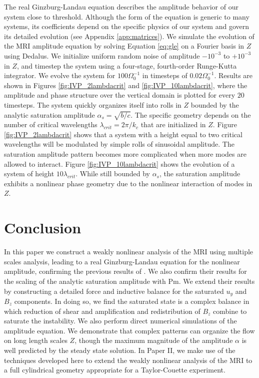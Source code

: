 \documentclass{emulateapj}
\newcommand{\Pm}{\mathrm{Pm}}
\begin{document}
The real Ginzburg-Landau equation describes the amplitude behavior of our system close to threshold. Although the form of the equation is generic to many systems, its coefficients depend on the specific physics of our system and govern its detailed evolution (see Appendix \ref{app:matrices}). We simulate the evolution of the MRI amplitude equation by solving Equation \ref{eq:gle} on a Fourier basis in $Z$ using Dedalus. We initialize uniform random noise of amplitude $-10^{-3}$ to $+10^{-3}$ in $Z$, and timestep the system using a four-stage, fourth-order Runge-Kutta integrator. We evolve the system for $100 \Omega_0^{-1}$ in timesteps of $0.02 \Omega_0^{-1}$. Results are shown in Figures \ref{fig:IVP_2lambdacrit} and \ref{fig:IVP_10lambdacrit}, where the amplitude and phase structure over the vertical domain is plotted for every $20$ timesteps. The system quickly organizes itself into rolls in $Z$ bounded by the analytic saturation amplitude $\alpha_s = \sqrt{b/c}$. The specific geometry depends on the number of critical wavelengths $\lambda_{crit} = 2\pi/k_c$ that are initialized in $Z$. Figure \ref{fig:IVP_2lambdacrit} shows that a system with a height equal to two critical wavelengths will be modulated by simple rolls of sinusoidal amplitude. The saturation amplitude pattern becomes more complicated when more modes are allowed to interact. Figure \ref{fig:IVP_10lambdacrit} shows the evolution of a system of height $10 \lambda_{crit}$. While still bounded by $\alpha_s$, the saturation amplitude exhibits a nonlinear phase geometry due to the nonlinear interaction of modes in $Z$. 

\section{Conclusion}
\label{sec:conclusion}

In this paper we construct a weakly nonlinear analysis of the MRI using multiple scales analysis, leading to a real Ginzburg-Landau equation for the nonlinear amplitude, confirming the previous results of \citet{Umurhan:2007hs}. We also confirm their results for the scaling of the analytic saturation amplitude with $\Pm$. We extend their results by constructing a detailed force and inductive balance for the saturated $u_y$ and $B_z$ components. In doing so, we find the saturated state is a complex balance in which reduction of shear and amplification and redistribution of $B_z$ combine to saturate the instability. We also perform direct numerical simulations of the amplitude equation. We demonstrate that complex patterns can organize the flow on long length scales $Z$, though the maximum magnitude of the amplitude $\alpha$ is well predicted by the steady state solution. In Paper II, we make use of the techniques developed here to extend the weakly nonlinear analysis of the MRI to a full cylindrical geometry appropriate for a Taylor-Couette experiment. 
\end{document}
